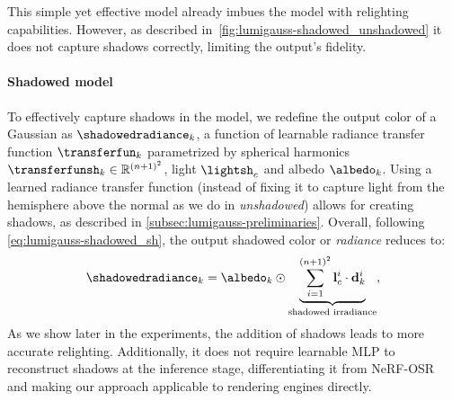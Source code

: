       This simple yet effective model already imbues the model with relighting
      capabilities.
      However, as described in~\cref{fig:lumigauss-shadowed_unshadowed} it
      does not capture shadows correctly, limiting the output's fidelity.

      
    \paragraph{Shadowed model}
      To effectively capture shadows in the model, we redefine the output
      color of a Gaussian as $\shadowedradiance_k$, a function of learnable
      radiance transfer function $\transferfun_k$ parametrized by spherical
      harmonics $\transferfunsh_k \in \mathbb{R}^{(n+1)^2}$, light
      $\lightsh_c$ and albedo $\albedo_k$.
      Using a learned radiance transfer function (instead of fixing it to
      capture light from the hemisphere above the normal as we do in
      \textit{unshadowed}) allows for creating shadows, as described in
      \cref{subsec:lumigauss-preliminaries}.
      Overall, following \cref{eq:lumigauss-shadowed_sh}, the output shadowed color or \textit{radiance} reduces to:
      \begin{equation}
        \label{eq:lumigauss-shadowed-radiance}
        \shadowedradiance_{k}   = \albedo_k \odot \underbrace{\sum_{i=1}^{(n+1)^2}{\mathbf{l}_c^i \cdot \mathbf{d}_{k}^i}}_{\text{shadowed irradiance}},
      \end{equation}
      As we show later in the experiments, the addition of shadows leads to
      more accurate relighting.
      Additionally, it does not require learnable MLP to reconstruct shadows
      at the inference stage, differentiating it from
      NeRF-OSR~\cite{rudnev2022nerfosr} and making our approach applicable to
      rendering engines directly.


      

